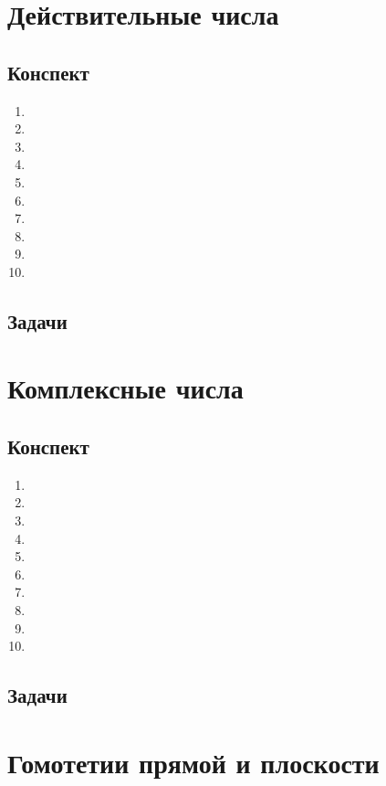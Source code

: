 \section{Действительные числа}

\subsection*{Конспект}
\begin{enumerate}\setlength{\itemsep}{1pt}
\item 
\item 
\item 
\item 
\item 
\item 
\item 
\item 
\item 
\item 
\end{enumerate}
\subsection*{Задачи}


\section{Комплексные числа}

\subsection*{Конспект}
\begin{enumerate}\setlength{\itemsep}{1pt}
\item 
\item 
\item 
\item 
\item 
\item 
\item 
\item 
\item 
\item 
\end{enumerate}
\subsection*{Задачи}



\section{Гомотетии прямой и плоскости}


